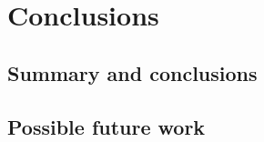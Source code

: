 \documentclass[main]{subfiles}
\begin{document}
\chapter{Conclusions}

\section{Summary and conclusions}

\section{Possible future work}
\end{document}
